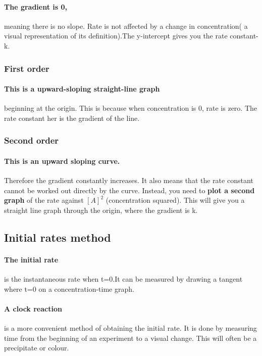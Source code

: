 \paragraph{The gradient is 0,}meaning there is no slope. Rate is not affected by a change in concentration( a visual representation of its definition).The y-intercept gives you the rate constant-k.
\subsubsection{First order}
\paragraph{This is a upward-sloping straight-line graph}beginning at the origin. This is because when concentration is 0, rate is zero. The rate constant her is the gradient of the line.
\subsubsection{Second order}
\paragraph{This is an upward sloping curve.}Therefore the gradient constantly increases. It also means that the rate constant cannot be worked out directly by the curve. Instead, you need to \textbf{plot a second graph} of the rate against $[A]^2$ (concentration squared). This will give you a straight line graph through the origin, where the gradient is k.
\subsection{Initial rates method}
\paragraph{The initial rate}is the instantaneous rate when t=0.It can be measured by drawing a tangent where t=0 on a concentration-time graph.
\paragraph{A clock reaction}is a more convenient method of obtaining the initial rate. It is done by measuring time from the beginning of an experiment to a visual change. This will often be a precipitate or colour.


